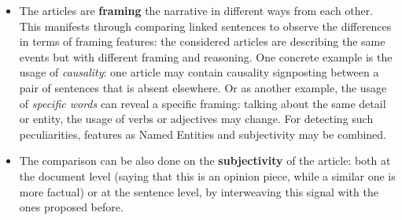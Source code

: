 \begin{itemize}
    \item The articles are \textbf{framing} the narrative in different ways from each other. This manifests through comparing linked sentences to observe the differences in terms of framing features: the considered articles are describing the same events but with different framing and reasoning.
    One concrete example is the usage of \emph{causality}: one article may contain causality signposting between a pair of sentences that is absent elsewhere.
    Or as another example, the usage of \emph{specific words} can reveal a specific framing: talking about the same detail or entity, the usage of verbs or adjectives may change.
    For detecting such peculiarities, %
    features as Named Entities and subjectivity may be combined.

    \item The comparison can be also done on the \textbf{subjectivity} of the article: both at the document level (saying that this is an opinion piece, while a similar one is more factual) or at the sentence level, by interweaving this signal with the ones proposed before.

\end{itemize}


